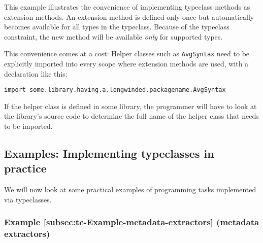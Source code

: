 This example illustrates the convenience of implementing typeclass
methods as extension methods. An extension method is defined only
once but automatically becomes available for all types in the typeclass.
Because of the typeclass constraint, the new method will be available
\emph{only} for supported types.

This convenience comes at a cost: Helper classes such as \lstinline!AvgSyntax!
need to be explicitly imported into every scope where extension methods
are used, with a declaration like this:
\begin{lstlisting}
import some.library.having.a.longwinded.packagename.AvgSyntax
\end{lstlisting}
If the helper class is defined in some library, the programmer will
have to look at the library\textsf{'}s source code to determine the full name
of the helper class that needs to be imported.

\subsection{Examples: Implementing typeclasses in practice}

We will now look at some practical examples of programming tasks implemented
via typeclasses.

\subsubsection{Example \label{subsec:tc-Example-metadata-extractors}\ref{subsec:tc-Example-metadata-extractors}
(metadata extractors)}

